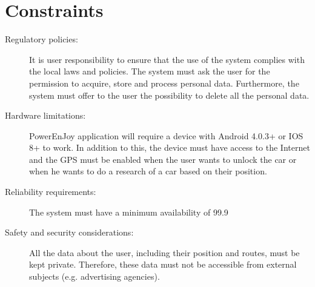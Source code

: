 \section{Constraints}
\begin{description}
\item[Regulatory policies:] It is user responsibility to ensure that the use of the system complies with the
local laws and policies.
The system must ask the user for the permission to acquire, store and process personal data. Furthermore, the system must offer to the user the possibility to delete all the personal data.
\item[Hardware limitations:] PowerEnJoy application will require a device with Android 4.0.3+ or IOS 8+ to work. In addition to this, the device must have access to the Internet and the GPS must be enabled when the user wants to unlock the car or when he wants to do a research of a car based on their position.
\item[Reliability requirements:] The system must have a minimum availability of 99.9%
\item[Safety and security considerations:] All the data about the user, including their position and routes, must be kept private.
Therefore, these data must not be accessible from external subjects (e.g. advertising agencies).
\end{description}
